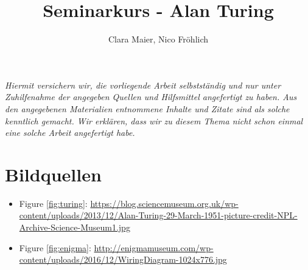 \documentclass[11pt,a4paper]{article}
\author{Clara Maier, Nico Fröhlich}
\title{Seminarkurs - Alan Turing}
\begin{document}
\maketitle
\newpage
\emph{Hiermit versichern wir, die vorliegende Arbeit selbstständig und nur unter Zuhilfenahme der angegeben Quellen und Hilfsmittel angefertigt zu haben. Aus den angegebenen Materialien entnommene Inhalte und Zitate sind als solche kenntlich gemacht. Wir erklären, dass wir zu diesem Thema nicht schon einmal eine solche Arbeit angefertigt habe.}
\newpage

\tableofcontents
\newpage







\section*{Bildquellen}
{\renewcommand\labelitemi{}
\begin{itemize}
\item Figure \ref{fig:turing}: \href{https://blog.sciencemuseum.org.uk/wp-content/uploads/2013/12/Alan-Turing-29-March-1951-picture-credit-NPL-Archive-Science-Museum1.jpg}{https://blog.sciencemuseum.org.uk/wp-content/uploads/2013/12/Alan-Turing-29-March-1951-picture-credit-NPL-Archive-Science-Museum1.jpg}
\item Figure \ref{fig:enigma}: \href{http://enigmamuseum.com/wp-content/uploads/2016/12/WiringDiagram-1024x776.jpg}{http://enigmamuseum.com/wp-content/uploads/2016/12/WiringDiagram-1024x776.jpg}
\end{itemize}
}



\end{document}
